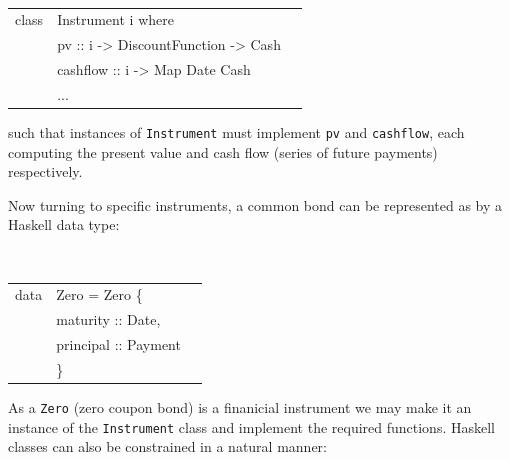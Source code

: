 \documentclass[11pt]{article}
\begin{document}

\begin{center}
\tt
\begin{tabular}{lll}
class & Instrument i where\\
      &\hspace{-1cm} pv \hspace{1.18cm}:: i -> DiscountFunction -> Cash\\
      &\hspace{-1cm} cashflow :: i -> Map Date Cash\\
      &\hspace{-1cm} ...\\
\end{tabular}
\end{center}

such that instances of {\tt Instrument} must implement {\tt pv} and {\tt cashflow}, each
computing the present value and cash flow (series of future payments) respectively.

Now turning to specific instruments, a common bond can be represented as by a
Haskell data type:

\begin{center}
\tt
\begin{tabular}{lll}
data & Zero = Zero \{\\
      &\hspace{-1cm} maturity  :: Date,\\
      &\hspace{-1cm} principal :: Payment\\
      &\hspace{-0.8cm}\}
\end{tabular}
\end{center}

As a {\tt Zero} (zero coupon bond) is a finanicial instrument we may make it an instance of
the {\tt Instrument} class and implement the required functions.
Haskell classes can also be constrained in a natural manner:\\
\end{document}
